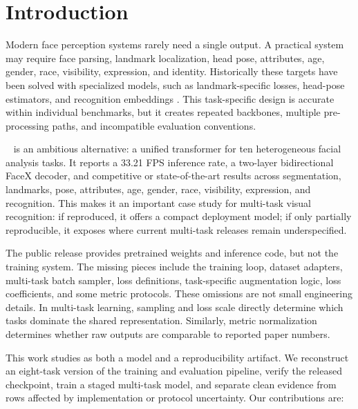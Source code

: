 \section{Introduction}

Modern face perception systems rarely need a single output. A practical system may require face parsing, landmark localization, head pose, attributes, age, gender, race, visibility, expression, and identity. Historically these targets have been solved with specialized models, such as landmark-specific losses, head-pose estimators, and recognition embeddings \citep{wing2018,star2023,tokenhpe2023,arcface2019,partialfc2021}. This task-specific design is accurate within individual benchmarks, but it creates repeated backbones, multiple pre-processing paths, and incompatible evaluation conventions.

\method~\citep{facexformer2025} is an ambitious alternative: a unified transformer for ten heterogeneous facial analysis tasks. It reports a 33.21 FPS inference rate, a two-layer bidirectional FaceX decoder, and competitive or state-of-the-art results across segmentation, landmarks, pose, attributes, age, gender, race, visibility, expression, and recognition. This makes it an important case study for multi-task visual recognition: if reproduced, it offers a compact deployment model; if only partially reproducible, it exposes where current multi-task releases remain underspecified.

The public \method release provides pretrained weights and inference code, but not the training system. The missing pieces include the training loop, dataset adapters, multi-task batch sampler, loss definitions, task-specific augmentation logic, loss coefficients, and some metric protocols. These omissions are not small engineering details. In multi-task learning, sampling and loss scale directly determine which tasks dominate the shared representation. Similarly, metric normalization determines whether raw outputs are comparable to reported paper numbers.

This work studies \method as both a model and a reproducibility artifact. We reconstruct an eight-task version of the training and evaluation pipeline, verify the released checkpoint, train a staged multi-task model, and separate clean evidence from rows affected by implementation or protocol uncertainty. Our contributions are:

